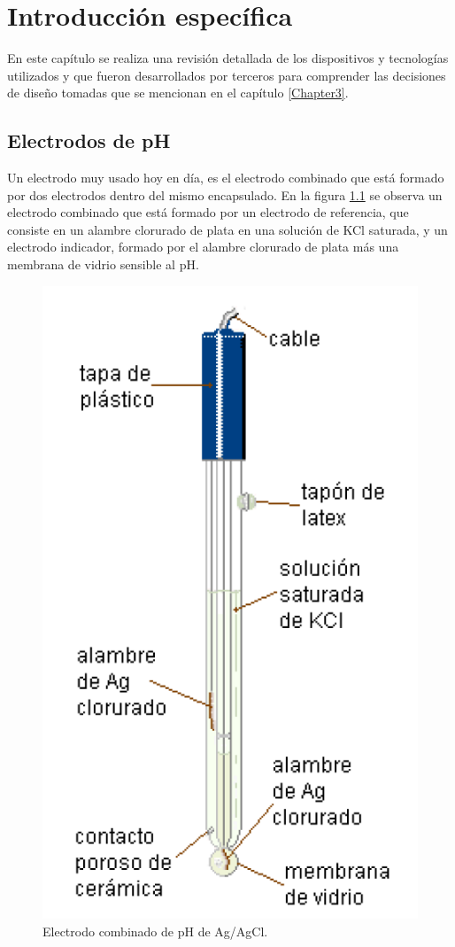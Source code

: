 \chapter{Introducción específica} %

\label{Chapter2}

En este capítulo se  realiza una revisión detallada de los dispositivos y tecnologías utilizados y que fueron desarrollados por terceros para comprender las decisiones de diseño tomadas que se mencionan en el capítulo \ref{Chapter3}. 

\section{Electrodos de pH}
\label{sec:electrodoPH}

Un electrodo muy usado hoy en día, es el electrodo combinado que está formado por dos electrodos dentro del mismo encapsulado. En la figura \ref{fig:electrodoCombinado} se observa un electrodo combinado que está formado por un electrodo de referencia, que consiste en un alambre clorurado de plata en una solución de KCl saturada, y un electrodo indicador, formado por el alambre clorurado de plata más una membrana de vidrio sensible al pH.

\begin{figure}[htbp]
	\centering
	\includegraphics[width=.5\textwidth]{./Figures/electrodoCombinado.png}
	\caption{Electrodo combinado de pH de Ag/AgCl\protect\footnotemark.}
	\label{fig:electrodoCombinado}
\end{figure}

